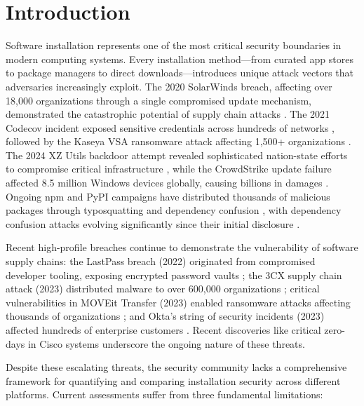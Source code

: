 \documentclass[11pt,a4paper]{article}
\begin{document}
\section{Introduction}

Software installation represents one of the most critical security boundaries in modern computing systems. Every installation method—from curated app stores to package managers to direct downloads—introduces unique attack vectors that adversaries increasingly exploit. The 2020 SolarWinds breach, affecting over 18,000 organizations through a single compromised update mechanism, demonstrated the catastrophic potential of supply chain attacks \cite{fireeye2020sunburst,solarwinds2024sec}. The 2021 Codecov incident exposed sensitive credentials across hundreds of networks \cite{codecov2021incident}, followed by the Kaseya VSA ransomware attack affecting 1,500+ organizations \cite{kaseya2021ransomware}. The 2024 XZ Utils backdoor attempt revealed sophisticated nation-state efforts to compromise critical infrastructure \cite{xz2024backdoor}, while the CrowdStrike update failure affected 8.5 million Windows devices globally, causing billions in damages \cite{crowdstrike2024outage}. Ongoing npm and PyPI campaigns have distributed thousands of malicious packages through typosquatting and dependency confusion \cite{ladisa2023taxonomy,zimmermann2019npm,pypi2023malware,npm2022colors}, with dependency confusion attacks evolving significantly since their initial disclosure \cite{dependency2024confusion}.

Recent high-profile breaches continue to demonstrate the vulnerability of software supply chains: the LastPass breach (2022) originated from compromised developer tooling, exposing encrypted password vaults \cite{lastpass2022breach}; the 3CX supply chain attack (2023) distributed malware to over 600,000 organizations \cite{3cx2023attack}; critical vulnerabilities in MOVEit Transfer (2023) enabled ransomware attacks affecting thousands of organizations \cite{moveit2023vulnerability}; and Okta's string of security incidents (2023) affected hundreds of enterprise customers \cite{okta2023breaches}. Recent discoveries like critical zero-days in Cisco systems \cite{cisco2024vulnerability} underscore the ongoing nature of these threats.

Despite these escalating threats, the security community lacks a comprehensive framework for quantifying and comparing installation security across different platforms. Current assessments suffer from three fundamental limitations:
\end{document}
